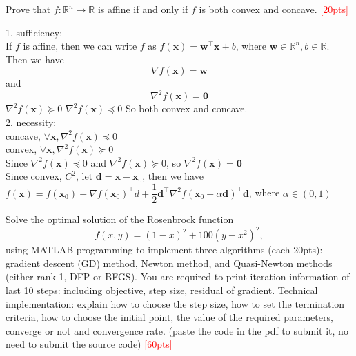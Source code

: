 \documentclass[10pt]{article}
\newenvironment{problem}[2][Problem]{\begin{trivlist}
\item[\hskip \labelsep {\bfseries #1}\hskip \labelsep {\bfseries #2.}]}{\end{trivlist}}
\begin{document}
\newpage

\begin{problem}{2}
    Prove that $f: \mathbb{R}^n \rightarrow \mathbb{R}$ is affine if and only if $f$ is both convex and concave. \textcolor{red}{[20pts]} 
\end{problem}

1. sufficiency:\\
If $f$ is affine, then we can write $f$ as $f(\pmb x)=\pmb w^{\top}\pmb x+b$, where $\pmb w\in \mathbb{R}^n, b\in \mathbb{R}$.\\
Then we have $$\nabla f(\pmb x)=\pmb w$$
and $$\nabla^2 f(\pmb x)=\pmb 0$$
$\nabla^2 f(\pmb x) \succeq 0$
$\nabla^2 f(\pmb x) \preceq 0$
So both convex and concave.\\

2. necessity:\\
concave, $\forall \pmb x, \nabla^2 f(\pmb x) \preceq 0$\\
convex, $\forall \pmb x, \nabla^2 f(\pmb x) \succeq 0$\\
Since $\nabla^2 f(\pmb x) \preceq 0$ and $\nabla^2 f(\pmb x) \succeq 0$, so $\nabla^2 f(\pmb x)=\pmb 0$\\

Since convex, $C^2$, let $\pmb d=\pmb x-\pmb x_0$, then we have
$f(\pmb x)=f(\pmb x_0) + \nabla f(\pmb x_0)^{\top}d+\dfrac{1}{2}{\pmb d}^{\top}\nabla^2 f(\pmb x_0 + \alpha\pmb d)^{\top}{\pmb d}$, where $\alpha\in(0,1)$\\




\newpage

\begin{problem}{3}
    Solve the optimal solution of the Rosenbrock function $$f(x, y) = (1 - x)^2 + 100(y - x^2)^2, $$ using MATLAB programming to implement three algorithms (each 20pts): gradient descent (GD) method, Newton method, and Quasi-Newton methods (either rank-1, DFP or BFGS). You are required to print iteration information of last 10 steps: including objective, step size, residual of gradient. Technical implementation: explain how to choose the step size, how to set the termination criteria, how to choose the initial point, the value of the required parameters, converge or not and convergence rate. (paste the code in the pdf to submit it, no need to submit the source code) \textcolor{red}{[60pts]}
\end{problem}


	











\end{document}
